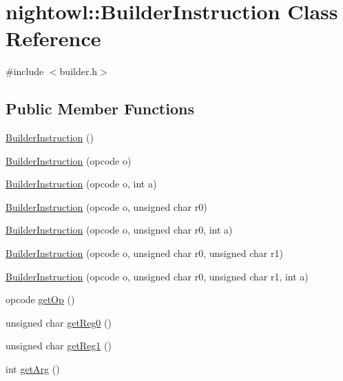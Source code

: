 \hypertarget{classnightowl_1_1BuilderInstruction}{\section{nightowl\-:\-:Builder\-Instruction Class Reference}
\label{classnightowl_1_1BuilderInstruction}
}


{\ttfamily \#include $<$builder.\-h$>$}

\subsection*{Public Member Functions}
\begin{DoxyCompactItemize}
\item 
\hyperlink{classnightowl_1_1BuilderInstruction_a1a4e127e178e3f9ee87f9e4e0172a8c8}{Builder\-Instruction} ()
\item 
\hyperlink{classnightowl_1_1BuilderInstruction_a5fa4f1c50e2bebc2569aa65793fc2848}{Builder\-Instruction} (opcode o)
\item 
\hyperlink{classnightowl_1_1BuilderInstruction_a50487df15dbfde3ac6d22abd1acd1957}{Builder\-Instruction} (opcode o, int a)
\item 
\hyperlink{classnightowl_1_1BuilderInstruction_acd98a1a14128ccd84d9e1d664e65496a}{Builder\-Instruction} (opcode o, unsigned char r0)
\item 
\hyperlink{classnightowl_1_1BuilderInstruction_aae490dcf303bd178c29ad6cdb0e62b58}{Builder\-Instruction} (opcode o, unsigned char r0, int a)
\item 
\hyperlink{classnightowl_1_1BuilderInstruction_a98b8e0f04bb8ee8ff3976cc7ebfa9044}{Builder\-Instruction} (opcode o, unsigned char r0, unsigned char r1)
\item 
\hyperlink{classnightowl_1_1BuilderInstruction_a5e520b9b52b937ab5f9e61b3b800aae8}{Builder\-Instruction} (opcode o, unsigned char r0, unsigned char r1, int a)
\item 
opcode \hyperlink{classnightowl_1_1BuilderInstruction_ac979ad24571352c2f5e2490b7361e42d}{get\-Op} ()
\item 
unsigned char \hyperlink{classnightowl_1_1BuilderInstruction_a54e35eb62a892ae7fae3c50e80c0b2e0}{get\-Reg0} ()
\item 
unsigned char \hyperlink{classnightowl_1_1BuilderInstruction_a6d1a613883690e142da44acccf2607e4}{get\-Reg1} ()
\item 
int \hyperlink{classnightowl_1_1BuilderInstruction_aea9689fe23a753e345afd60ff6cdbf4c}{get\-Arg} ()
\end{DoxyCompactItemize}


